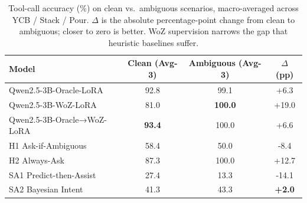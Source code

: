 \begin{table}[t]
\centering
\small
\setlength{\tabcolsep}{4pt}
\caption{Tool-call accuracy (\%) on clean vs.\ ambiguous scenarios, macro-averaged across YCB / Stack / Pour. $\Delta$ is the absolute percentage-point change from clean to ambiguous; closer to zero is better. WoZ supervision narrows the gap that heuristic baselines suffer.}
\label{tab:ambiguous_vs_clean}
\begin{tabular}{lccc}
\toprule
Model & Clean (Avg-3) & Ambiguous (Avg-3) & $\Delta$ (pp) \\
\midrule
Qwen2.5-3B-Oracle-LoRA & 92.8 & 99.1 & +6.3 \\
Qwen2.5-3B-WoZ-LoRA & 81.0 & \textbf{100.0} & +19.0 \\
Qwen2.5-3B-Oracle→WoZ-LoRA & \textbf{93.4} & 100.0 & +6.6 \\
\midrule
H1 Ask-if-Ambiguous & 58.4 & 50.0 & -8.4 \\
H2 Always-Ask & 87.3 & 100.0 & +12.7 \\
SA1 Predict-then-Assist & 27.4 & 13.3 & -14.1 \\
SA2 Bayesian Intent & 41.3 & 43.3 & \textbf{+2.0} \\
\bottomrule
\end{tabular}
\end{table}
